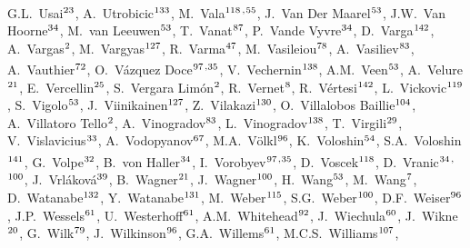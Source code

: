 \begin{flushleft}
G.L.~Usai$^\textrm{\scriptsize 23}$,
A.~Utrobicic$^\textrm{\scriptsize 133}$,
M.~Vala$^\textrm{\scriptsize 118}$\textsuperscript{,}$^\textrm{\scriptsize 55}$,
J.~Van Der Maarel$^\textrm{\scriptsize 53}$,
J.W.~Van Hoorne$^\textrm{\scriptsize 34}$,
M.~van Leeuwen$^\textrm{\scriptsize 53}$,
T.~Vanat$^\textrm{\scriptsize 87}$,
P.~Vande Vyvre$^\textrm{\scriptsize 34}$,
D.~Varga$^\textrm{\scriptsize 142}$,
A.~Vargas$^\textrm{\scriptsize 2}$,
M.~Vargyas$^\textrm{\scriptsize 127}$,
R.~Varma$^\textrm{\scriptsize 47}$,
M.~Vasileiou$^\textrm{\scriptsize 78}$,
A.~Vasiliev$^\textrm{\scriptsize 83}$,
A.~Vauthier$^\textrm{\scriptsize 72}$,
O.~V\'azquez Doce$^\textrm{\scriptsize 97}$\textsuperscript{,}$^\textrm{\scriptsize 35}$,
V.~Vechernin$^\textrm{\scriptsize 138}$,
A.M.~Veen$^\textrm{\scriptsize 53}$,
A.~Velure$^\textrm{\scriptsize 21}$,
E.~Vercellin$^\textrm{\scriptsize 25}$,
S.~Vergara Lim\'on$^\textrm{\scriptsize 2}$,
R.~Vernet$^\textrm{\scriptsize 8}$,
R.~V\'ertesi$^\textrm{\scriptsize 142}$,
L.~Vickovic$^\textrm{\scriptsize 119}$,
S.~Vigolo$^\textrm{\scriptsize 53}$,
J.~Viinikainen$^\textrm{\scriptsize 127}$,
Z.~Vilakazi$^\textrm{\scriptsize 130}$,
O.~Villalobos Baillie$^\textrm{\scriptsize 104}$,
A.~Villatoro Tello$^\textrm{\scriptsize 2}$,
A.~Vinogradov$^\textrm{\scriptsize 83}$,
L.~Vinogradov$^\textrm{\scriptsize 138}$,
T.~Virgili$^\textrm{\scriptsize 29}$,
V.~Vislavicius$^\textrm{\scriptsize 33}$,
A.~Vodopyanov$^\textrm{\scriptsize 67}$,
M.A.~V\"{o}lkl$^\textrm{\scriptsize 96}$,
K.~Voloshin$^\textrm{\scriptsize 54}$,
S.A.~Voloshin$^\textrm{\scriptsize 141}$,
G.~Volpe$^\textrm{\scriptsize 32}$,
B.~von Haller$^\textrm{\scriptsize 34}$,
I.~Vorobyev$^\textrm{\scriptsize 97}$\textsuperscript{,}$^\textrm{\scriptsize 35}$,
D.~Voscek$^\textrm{\scriptsize 118}$,
D.~Vranic$^\textrm{\scriptsize 34}$\textsuperscript{,}$^\textrm{\scriptsize 100}$,
J.~Vrl\'{a}kov\'{a}$^\textrm{\scriptsize 39}$,
B.~Wagner$^\textrm{\scriptsize 21}$,
J.~Wagner$^\textrm{\scriptsize 100}$,
H.~Wang$^\textrm{\scriptsize 53}$,
M.~Wang$^\textrm{\scriptsize 7}$,
D.~Watanabe$^\textrm{\scriptsize 132}$,
Y.~Watanabe$^\textrm{\scriptsize 131}$,
M.~Weber$^\textrm{\scriptsize 115}$,
S.G.~Weber$^\textrm{\scriptsize 100}$,
D.F.~Weiser$^\textrm{\scriptsize 96}$,
J.P.~Wessels$^\textrm{\scriptsize 61}$,
U.~Westerhoff$^\textrm{\scriptsize 61}$,
A.M.~Whitehead$^\textrm{\scriptsize 92}$,
J.~Wiechula$^\textrm{\scriptsize 60}$,
J.~Wikne$^\textrm{\scriptsize 20}$,
G.~Wilk$^\textrm{\scriptsize 79}$,
J.~Wilkinson$^\textrm{\scriptsize 96}$,
G.A.~Willems$^\textrm{\scriptsize 61}$,
M.C.S.~Williams$^\textrm{\scriptsize 107}$,

\end{flushleft}
